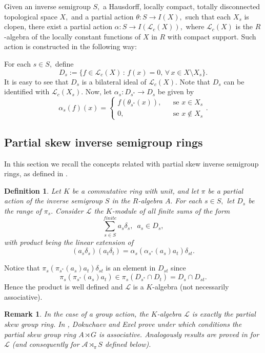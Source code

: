 \documentclass[11pt, a4paper]{amsart}
\newcommand{\Lc}{\ensuremath {\mathcal{L}_c(X)}}
\newcommand{\Lcs}{\ensuremath {\mathcal{L}_c(X_s)}}
\newcommand{\Skew}{\ensuremath {\mathcal{A} \rtimes_\pi S}}
\theoremstyle{plain}
\newtheorem{definition}[theorem]{Definition}
\newtheorem{remark}[theorem]{Remark}
\begin{document}
Given an inverse semigroup $S,$ a Hausdorff, locally compact, totally disconnected topological space $X,$ and a partial action $\theta: S \rightarrow I(X),$  such that each $X_s$ is clopen, there exist a partial action  $\alpha: S \rightarrow I(\Lc),$ where $\Lc$ is the $R$-algebra of the locally constant functions of $X$ in $R$ with compact support. Such action is constructed in the following way:

For each $s \in S,$ define 
  $$D_s:= \{ f \in \Lc \, : \, f(x)=0, \, \forall \, x  \in X \setminus X_s  \}.$$
It is easy to see that $D_s$ is a bilateral ideal of $\Lc.$ Note that  $D_s$ can be identified with $\Lcs.$ Now, let
$\alpha_s: D_{s^*} \rightarrow D_s$ be given by 
  $$ \alpha_s(f)(x)= \left\lbrace \begin{array}{ccr}
    f(\theta_{s^*}(x)), & & \mbox{se} \,\, x \in X_s \\
    0,                       & & \mbox{se} \,\, x \notin X_s  
    \end{array}\right..
  $$


\subsection{Partial skew inverse semigroup rings}\label{sectionskew}


In this section we recall the concepts related with partial skew inverse semigroup rings, as defined in \cite{Vieira}.

 
\begin{definition} Let $K$ be a commutative ring with unit, and let $\pi$ be a partial action of the inverse semigroup $S$ in the $R$-algebra $A.$ For each $s \in S,$ let $D_s$ be the range of $\pi_s.$ Consider $\mathcal{L}$ the $K$-module of all finite sums of the form
 $$ \sum_{s \in S}^{finite} a_s \delta_s,  \,\,\, a_s \in D_s ,$$
with product being the linear extension of
\begin{equation}\label{multiplicacaoL}
(a_s \delta_s)(a_t \delta_t) = \alpha_s(\alpha_{s^*} (a_s)a_t)\delta_{st}.
\end{equation}
\end{definition}

Notice that  $\pi_s(\pi_{s^*} (a_s)a_t)\delta_{st}$ is an element in $D_{st}$ since
  $$\pi_s(\pi_{s^*} (a_s)a_t) \in \pi_s(D_{s^*}\cap D_t)=D_s \cap D_{st}.$$
Hence the product is well defined and $\mathcal{L}$ is a $K$-algebra (not necessarily associative).

\begin{remark}In the case of a group action, the $K$-algebra $\mathcal{L}$ is exactly the partial skew group ring. In \cite{Dokuchaev1}, Dokuchaev and Exel prove under which conditions the partial skew group ring $A \rtimes G$ is associative. Analogously results are proved in \cite{Vieira} for $\mathcal{L}$ (and consequently for $\Skew$ defined below).
\end{remark}
\end{document}
